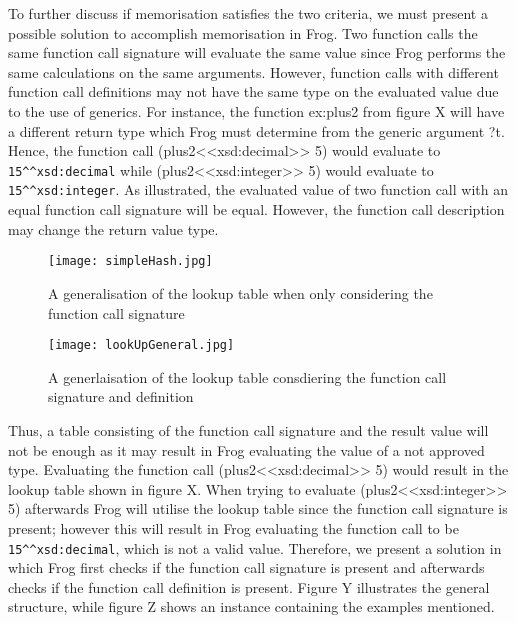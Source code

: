 \para
To further discuss if memorisation satisfies the two criteria, we must present a possible solution to accomplish memorisation in Frog. Two function calls the same function call signature will evaluate the same value since Frog performs the same calculations on the same arguments. However, function calls with different function call definitions may not have the same type on the evaluated value due to the use of generics. For instance, the function ex:plus2 from figure X will have a different return type which Frog must determine from the generic argument ?t. Hence, the function call (plus2<<xsd:decimal>> 5)  would evaluate to \lstinline{15^^xsd:decimal} while (plus2<<xsd:integer>> 5) would evaluate to \lstinline{15^^xsd:integer}. As illustrated, the evaluated value of two function call with an equal function call signature will be equal. However, the function call description may change the return value type.

\begin{figure}
    \centering
    \begin{minipage}{.5\textwidth}
      \centering
      \texttt{[image: simpleHash.jpg]}
      \caption{A generalisation of the lookup table when only considering the function call signature}
      \label{fig:simpleHash}
    \end{minipage}%
    \begin{minipage}{.5\textwidth}
      \centering
      \texttt{[image: lookUpGeneral.jpg]}
      \caption{A generlaisation of the lookup table consdiering the function call signature and definition}
      \label{fig:lookUpGeneral}
    \end{minipage}
\end{figure}

\para
Thus, a table consisting of the function call signature and the result value will not be enough as it may result in Frog evaluating the value of a not approved type. Evaluating the function call (plus2<<xsd:decimal>> 5) would result in the lookup table shown in figure X. When trying to evaluate (plus2<<xsd:integer>> 5) afterwards Frog will utilise the lookup table since the function call signature is present; however this will result in Frog evaluating the function call to be \lstinline{15^^xsd:decimal}, which is not a valid value. Therefore, we present a solution in which Frog first checks if the function call signature is present and afterwards checks if the function call definition is present. Figure Y illustrates the general structure, while figure Z shows an instance containing the examples mentioned. 

